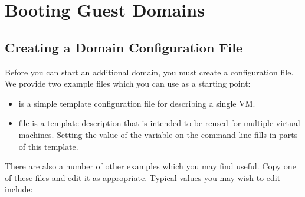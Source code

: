 \documentclass[11pt,twoside,final,openright]{report}
\begin{document}
%
%
%
\section{Booting Guest Domains}

\subsection{Creating a Domain Configuration File}

Before you can start an additional domain, you must create a
configuration file. We provide two example files which you can use as
a starting point:
\begin{itemize}
\item {} is a simple template configuration
  file for describing a single VM\@.
\item {} file is a template description that
  is intended to be reused for multiple virtual machines.  Setting the
  value of the  variable on the  command line
  fills in parts of this template.
\end{itemize}

There are also a number of other examples which you may find useful.
Copy one of these files and edit it as appropriate.  Typical values
you may wish to edit include:
\end{document}
